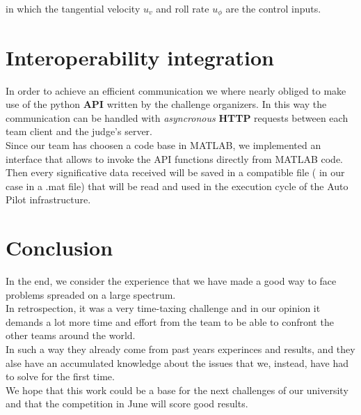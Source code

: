 \documentclass[oneside,onecolumn]{article}
\begin{document}
in which the tangential velocity $u_{v}$ and roll rate $u_{\phi}$ are the control inputs.

\section{Interoperability integration}
In order to achieve an efficient communication we where nearly obliged to make
use of the python \textbf{API} written by the challenge organizers. In this way the
communication can be handled with \textit{asyncronous} \textbf{HTTP} requests between each team
client and the judge's server.\\
Since our team has choosen a code base in MATLAB, we implemented an interface
that allows to invoke the API functions directly from MATLAB code.\\
Then every significative data received will be saved in a compatible file ( in
our case in a .mat file) that will be read and used in the execution cycle of the Auto
Pilot infrastructure.



\bigskip
\bigskip
\bigskip
\bigskip
\bigskip
\bigskip
\bigskip
\bigskip
\bigskip
\bigskip
\bigskip
\bigskip
\bigskip
\bigskip
\bigskip



\section{Conclusion}
In the end, we consider the experience that we have made a good way to face
problems spreaded on a large spectrum.\\
In retrospection, it was a very time-taxing challenge and in our opinion it
demands a lot more time and effort from the team to be able to confront the
other teams around the world.\\
In such a way they already  come from past years experinces and results,
and they alse have an accumulated knowledge about the issues that we, instead, have had to
solve for the first time.\\
We hope that this work could be a base for the next challenges of our university
and that the competition in June will score good results.
\end{document}

